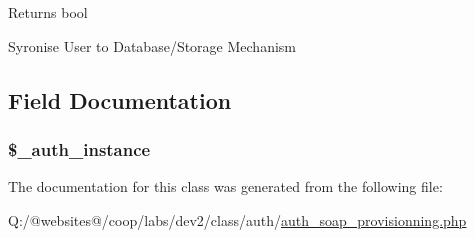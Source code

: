\begin{DoxyReturn}{Returns}
bool 
\end{DoxyReturn}
Syronise User to Database/\-Storage Mechanism

\subsection{Field Documentation}
\hypertarget{class_xortify_auth_soap_provisionning_a486ed878bb5a7188c99ac4c9ee46ac6e}{
\subsubsection[{\$\-\_\-auth\-\_\-instance}]{\setlength{\rightskip}{0pt plus 5cm}\$\-\_\-auth\-\_\-instance}}\label{class_xortify_auth_soap_provisionning_a486ed878bb5a7188c99ac4c9ee46ac6e}


The documentation for this class was generated from the following file\-:\begin{DoxyCompactItemize}
\item 
Q\-:/@websites@/coop/labs/dev2/class/auth/\hyperlink{auth__soap__provisionning_8php}{auth\-\_\-soap\-\_\-provisionning.\-php}\end{DoxyCompactItemize}
